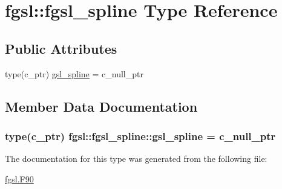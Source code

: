 \hypertarget{structfgsl_1_1fgsl__spline}{\section{fgsl\-:\-:fgsl\-\_\-spline Type Reference}
\label{structfgsl_1_1fgsl__spline}
}
\subsection*{Public Attributes}
\begin{DoxyCompactItemize}
\item 
type(c\-\_\-ptr) \hyperlink{structfgsl_1_1fgsl__spline_a4f3ae97855a4a1a7fef3927d5b65f453}{gsl\-\_\-spline} = c\-\_\-null\-\_\-ptr
\end{DoxyCompactItemize}


\subsection{Member Data Documentation}
\hypertarget{structfgsl_1_1fgsl__spline_a4f3ae97855a4a1a7fef3927d5b65f453}{
\subsubsection[{gsl\-\_\-spline}]{\setlength{\rightskip}{0pt plus 5cm}type(c\-\_\-ptr) fgsl\-::fgsl\-\_\-spline\-::gsl\-\_\-spline = c\-\_\-null\-\_\-ptr}}\label{structfgsl_1_1fgsl__spline_a4f3ae97855a4a1a7fef3927d5b65f453}


The documentation for this type was generated from the following file\-:\begin{DoxyCompactItemize}
\item 
\hyperlink{fgsl_8F90}{fgsl.\-F90}\end{DoxyCompactItemize}
